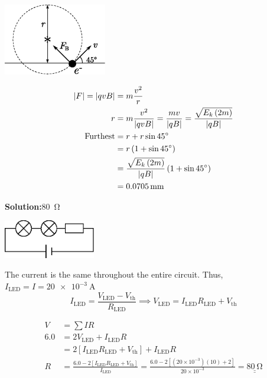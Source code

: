 \documentclass[11pt]{article}
\newcommand*\circled[1]{\tikz[baseline=(char.base)]{
		\node[shape=circle,draw,inner sep=2pt] (char) {#1};}}
\def\doubleunderline#1{\underline{\underline{#1}}}
\newcommand{\solution}[2]{\textbf{Solution:\hspace{1em}\circled{#1}}\hspace{1em}#2\hspace{1em}}
\newlength{\currentparskip}
\begin{document}
\begin{enumerate}[label={[Q\arabic*]},itemsep={1em}]
			\begin{minipage}[c]{5cm}
				\includegraphics[width=4.5cm]{40.eps}
			\end{minipage}%
			\setlength{\currentparskip}{\parskip}		%
			\begin{minipage}{\textwidth - 7cm}
				\setlength{\parskip}{\currentparskip}	%
				\noindent
				\begin{align*}
					|F| = |qvB| &= m\frac{v^2}{r} \\
					r &= m\frac{v^2}{|qvB|} = \frac{mv}{|qB|} = \frac{\sqrt{E_k\left(2m\right)}}{|qB|} \\
					\text{Furthest} &= r + r\sin 45\degree \\
					&= r\left(1+\sin 45 \degree \right) \\ 					
					&= \frac{\sqrt{E_k\left(2m\right)}}{|qB|}\left(1+\sin 45 \degree \right) \\
					&= \SI{0.0705}{\milli\meter}
				\end{align*}
			\end{minipage}
		
		\item \solution{E}{\SI{80}{\ohm}}
		
			\begin{minipage}[c]{4.5cm}
				\includegraphics[width=4cm]{41.eps}
			\end{minipage}%
			\setlength{\currentparskip}{\parskip}		%
			\begin{minipage}{\textwidth - 6.5cm}
				\setlength{\parskip}{\currentparskip}	%
				\noindent
				The current is the same throughout the entire circuit. Thus, $I_\text{LED} = I = \SI{20e-3}{\ampere}$
				\begin{equation*}
					I_\text{LED} = \frac{V_\text{LED}-V_\text{th}}{R_\text{LED}} \implies V_\text{LED} = I_\text{LED}R_\text{LED} + V_\text{th}
				\end{equation*}
			\end{minipage}
			\begin{align*}
				V &= \sum I\!R \\
				6.0 &= 2V_\text{LED} + I_\text{LED}R \\[0.3em]
				&= 2\left[I_\text{LED}R_\text{LED} + V_\text{th}\right] + I_\text{LED}R \\[0.3em]
				R &= \frac{6.0 - 2\left[I_\text{LED}R_\text{LED} + V_\text{th}\right]}{I_\text{LED}} = \frac{6.0 - 2\left[\left(20\times 10^{-3}\right)\left(10\right) + 2\right]}{20\times 10^{-3}} = \doubleunderline{\SI{80}{\ohm}}
			\end{align*}
			

\end{enumerate}
\end{document}
